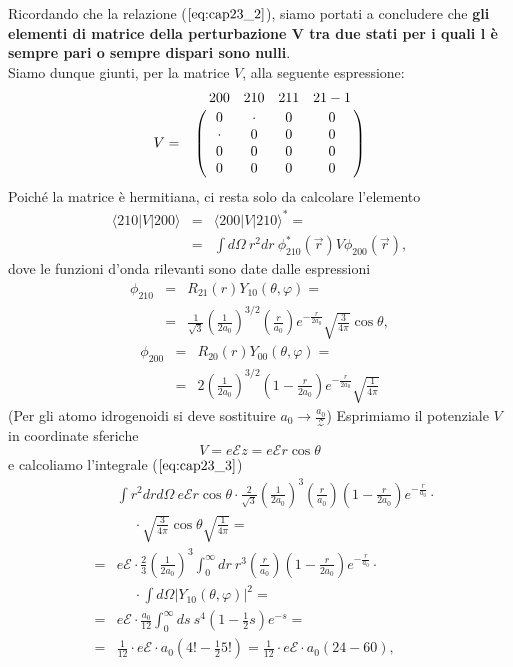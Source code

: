 \documentclass[a4paper,12pt,oneside]{book}
\begin{document}
Ricordando che la relazione ($\ref{eq:cap23_2}$), siamo portati a concludere che \textbf{gli elementi di matrice della perturbazione $\boldsymbol{V}$ tra due stati per i quali $\boldsymbol{l}$ è sempre pari o sempre dispari sono nulli}.\\
Siamo dunque giunti, per la matrice $V$, alla seguente espressione:
\begin{equation}  
V=
\bordermatrix{~&200&210&211&21-1\cr
& 0 & \cdot & 0 & 0 \cr
& \cdot & 0 & 0 & 0 \cr
& 0 & 0 & 0 & 0 \cr
& 0 & 0 & 0 & 0 \cr}
\end{equation}
Poiché la matrice è hermitiana, ci resta solo da calcolare l'elemento 
\begin{eqnarray} \label{eq:cap23_3}
\langle 210| V |200 \rangle & =&  \langle 200| V |210 \rangle^* = \nonumber \\
& = &\int d\Omega \ r^2 dr \ \phi_{210}^*(\vec{r}) V \phi_{200}(\vec{r}),
\end{eqnarray}
dove le funzioni d'onda rilevanti sono date dalle espressioni
\begin{eqnarray} 
\phi_{210}& = &R_{21}(r)Y_{10}(\theta, \varphi)= \nonumber  \\
& = & \frac{1}{\sqrt{3}}\left( \frac{1}{2a_0} \right)^{3/2} \left( \frac{r}{a_0} \right) e^{-\frac{r}{2a_0}} \sqrt{\frac{3}{4 \pi}} \cos \theta ,
\end{eqnarray}
\begin{eqnarray}
\phi_{200}& = & R_{20}(r)Y_{00}(\theta, \varphi)= \nonumber \\
& = & 2\left( \frac{1}{2a_0} \right)^{3/2} \left( 1-\frac{r}{2a_0} \right) e^{-\frac{r}{2a_0}} \sqrt{\frac{1}{4 \pi}} 
\end{eqnarray}
(Per gli atomo idrogenoidi si deve sostituire $a_0 \to \frac{a_0}{\mathcal{Z}}$)
Esprimiamo il potenziale $V$ in coordinate sferiche 
\begin{equation}
V=e \mathcal{E}z=e \mathcal{E} r \cos\theta
\end{equation}
e calcoliamo l'integrale ($\ref{eq:cap23_3}$) 
\begin{eqnarray}
 &  &\int r^2 dr d\Omega \   e \mathcal{E} r \cos\theta \cdot    \frac{2}{\sqrt{3}} \left( \frac{1}{2a_0} \right)^{3}   \left( \frac{r}{a_0} \right)     \left( 1-\frac{r}{2a_0} \right)  e^{-\frac{r}{a_0}} \cdot  \nonumber \\
 &  &\quad \  \cdot \sqrt{\frac{3}{4 \pi}} \cos \theta \sqrt{\frac{1}{4 \pi}}=  \nonumber \\ \nonumber
 & =& e \mathcal{E} \cdot \frac{2}{3}  \left( \frac{1}{2a_0} \right)^{3} \int_0^{\infty} dr \ r^3 \left( \frac{r}{a_0} \right)     \left( 1-\frac{r}{2a_0} \right)  e^{-\frac{r}{a_0}} \cdot \\ \nonumber
 & &\quad \ \cdot \int d\Omega \left| Y_{10}(\theta, \varphi) \right|^2=  \nonumber \\
 & =& e \mathcal{E} \cdot \frac{a_0}{12} \int_0^{\infty} ds \ s^4 \left(1-\frac{1}{2}s \right) e^{-s} = \nonumber \\
 & =& \frac{1}{12} \cdot e \mathcal{E} \cdot a_0 \left( 4!-\frac{1}{2}5! \right)= \frac{1}{12} \cdot  e \mathcal{E} \cdot a_0 (24-60),
\end{eqnarray}
\end{document}
